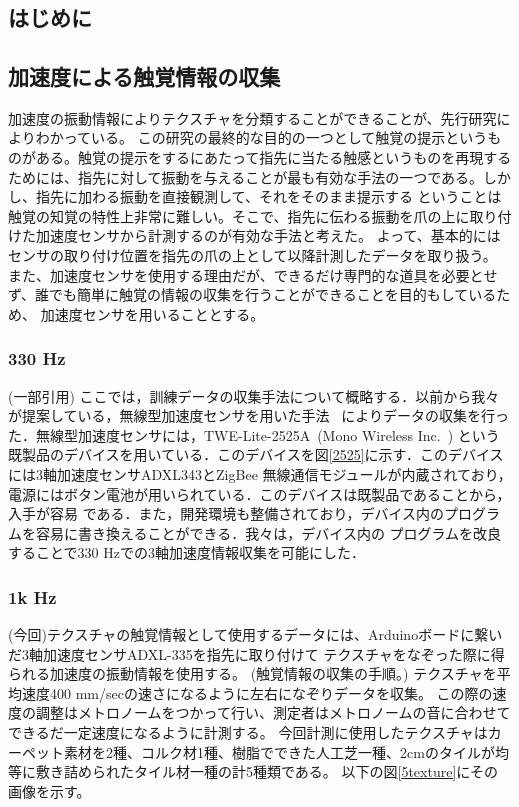 ﻿\chapter{} \label{sec:proposal}
\section{はじめに}

\section{加速度による触覚情報の収集}
	加速度の振動情報によりテクスチャを分類することができることが、先行研究によりわかっている。
	この研究の最終的な目的の一つとして触覚の提示というものがある。触覚の提示をするにあたって指先に当たる触感というものを再現する
	ためには、指先に対して振動を与えることが最も有効な手法の一つである。しかし、指先に加わる振動を直接観測して、それをそのまま提示する
	ということは触覚の知覚の特性上非常に難しい。そこで、指先に伝わる振動を爪の上に取り付けた加速度センサから計測するのが有効な手法と考えた。
	よって、基本的にはセンサの取り付け位置を指先の爪の上として以降計測したデータを取り扱う。
	また、加速度センサを使用する理由だが、できるだけ専門的な道具を必要とせず、誰でも簡単に触覚の情報の収集を行うことができることを目的もしているため、
	加速度センサを用いることとする。
	\subsection{330 Hz}
	(一部引用) 
	ここでは，訓練データの収集手法について概略する．以前から我々が提案している，無線型加速度センサを用いた手法
	~\cite{PBL}によりデータの収集を行った．無線型加速度センサには，TWE-Lite-2525A~(Mono Wireless Inc.~\cite{2525})
	という既製品のデバイスを用いている．このデバイスを図\ref{2525}に示す．このデバイスには3軸加速度センサADXL343とZigBee 
	無線通信モジュールが内蔵されており，電源にはボタン電池が用いられている．このデバイスは既製品であることから，入手が容易
	である．また，開発環境も整備されており，デバイス内のプログラムを容易に書き換えることができる．我々は，デバイス内の
	プログラムを改良することで330 Hzでの3軸加速度情報収集を可能にした．

	\subsection{1k Hz}
		(今回)テクスチャの触覚情報として使用するデータには、Arduinoボードに繋いだ3軸加速度センサADXL-335を指先に取り付けて
		テクスチャをなぞった際に得られる加速度の振動情報を使用する。
		(触覚情報の収集の手順。)
		テクスチャを平均速度400 mm/secの速さになるように左右になぞりデータを収集。
		この際の速度の調整はメトロノームをつかって行い、測定者はメトロノームの音に合わせてできるだ一定速度になるように計測する。
		今回計測に使用したテクスチャはカーペット素材を2種、コルク材1種、樹脂でできた人工芝一種、2cmのタイルが均等に敷き詰められたタイル材一種の計5種類である。
		以下の図\ref{5texture}にその画像を示す。
	
